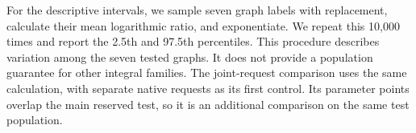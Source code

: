 For the descriptive intervals, we sample seven graph labels with
replacement, calculate their mean logarithmic ratio, and exponentiate.
We repeat this 10,000 times and report the 2.5th and 97.5th percentiles.
This procedure describes variation among the seven tested graphs.
It does not provide a population guarantee for other integral families.
The joint-request comparison uses the same calculation, with separate
native requests as its first control. Its parameter points overlap the
main reserved test, so it is an additional comparison on the same test
population.
